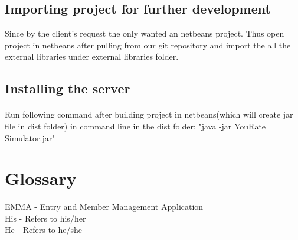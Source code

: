 \documentclass[10pt,a4paper]{article}
\begin{document}
\subsection{Importing project for further development}
Since by the client's request the only wanted an netbeans project. Thus open project in netbeans after pulling from our git repository and import the all the external libraries under external libraries folder.
\subsection{Installing the server}
\paragraph{}
Run following command after building project in netbeans(which will create jar file in dist folder) in command line in the dist folder: "java -jar YouRate Simulator.jar"
\section{Glossary}
EMMA - Entry and Member Management Application\\
His - Refers to his/her\\
He - Refers to he/she
\end{document}
